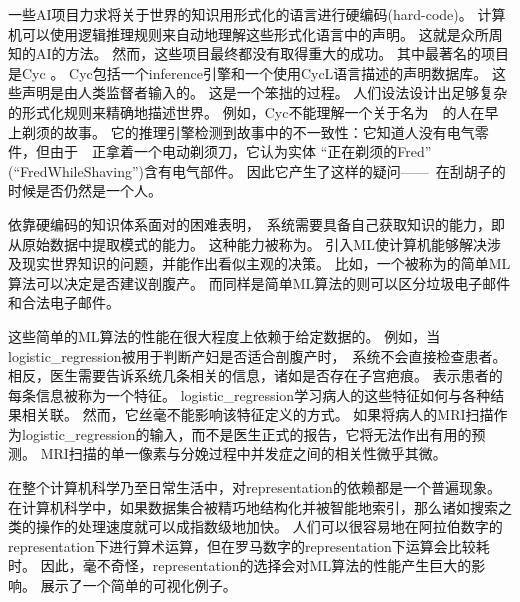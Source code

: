 一些\gls{AI}项目力求将关于世界的知识用形式化的语言进行硬编码(hard-code)。
计算机可以使用逻辑推理规则来自动地理解这些形式化语言中的声明。
这就是众所周知的\gls{AI}的方法。
然而，这些项目最终都没有取得重大的成功。
其中最著名的项目是Cyc \citep{Lenat-1989-book}。
Cyc包括一个\gls{inference}引擎和一个使用CycL语言描述的声明数据库。
这些声明是由人类监督者输入的。
这是一个笨拙的过程。
人们设法设计出足够复杂的形式化规则来精确地描述世界。
例如，Cyc不能理解一个关于名为~~的人在早上剃须的故事\citep{MachineChangedWorld}。
它的推理引擎检测到故事中的不一致性：它知道人没有电气零件，但由于~~正拿着一个电动剃须刀，它认为实体
``正在剃须的Fred''\,(``FredWhileShaving'')含有电气部件。
因此它产生了这样的疑问——~在刮胡子的时候是否仍然是一个人。

依靠硬编码的知识体系面对的困难表明，~系统需要具备自己获取知识的能力，即从原始数据中提取模式的能力。
这种能力被称为。
引入\gls{ML}使计算机能够解决涉及现实世界知识的问题，并能作出看似主观的决策。
比如，一个被称为的简单\gls{ML}算法可以决定是否建议剖腹产\citep{MorYosef90}。
而同样是简单\gls{ML}算法的则可以区分垃圾电子邮件和合法电子邮件。


这些简单的\gls{ML}算法的性能在很大程度上依赖于给定数据的。
例如，当\gls{logistic_regression}被用于判断产妇是否适合剖腹产时，~系统不会直接检查患者。
相反，医生需要告诉系统几条相关的信息，诸如是否存在子宫疤痕。
表示患者的每条信息被称为一个特征。
\gls{logistic_regression}学习病人的这些特征如何与各种结果相关联。
然而，它丝毫不能影响该特征定义的方式。
如果将病人的MRI扫描作为\gls{logistic_regression}的输入，而不是医生正式的报告，它将无法作出有用的预测。
MRI扫描的单一像素与分娩过程中并发症之间的相关性微乎其微。

在整个计算机科学乃至日常生活中，对\gls{representation}的依赖都是一个普遍现象。
在计算机科学中，如果数据集合被精巧地结构化并被智能地索引，那么诸如搜索之类的操作的处理速度就可以成指数级地加快。
人们可以很容易地在阿拉伯数字的\gls{representation}下进行算术运算，但在罗马数字的\gls{representation}下运算会比较耗时。
因此，毫不奇怪，\gls{representation}的选择会对\gls{ML}算法的性能产生巨大的影响。
展示了一个简单的可视化例子。

